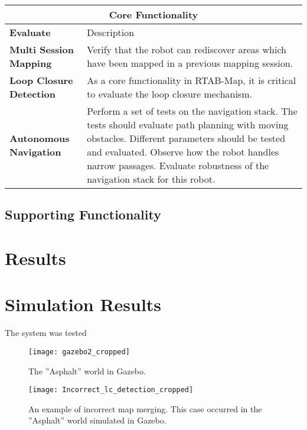 \begin{table}
	\centering
	\begin{tabular}{ p{2.5cm} | p{7cm} }
	\multicolumn{2}{c}{Core Functionality}\\
\hline
	\textbf{Evaluate} & Description\\
	\hline
	\textbf{Multi Session Mapping} & Verify that the robot can rediscover areas which have been mapped in a previous mapping session.\\
	\hline
	\textbf{Loop Closure Detection} & As a core functionality in \ac{RTAB-Map}, it is critical to evaluate the loop closure mechanism.\\
	\hline
	\textbf{Autonomous Navigation} & Perform a set of tests on the navigation stack. The tests should evaluate path planning with moving obstacles. Different parameters should be tested and evaluated. Observe how the robot handles narrow passages. Evaluate robustness of the navigation stack for this robot.\\
	\hline
	\end{tabular}
	\caption{}
\end{table}


\subsection{Supporting Functionality}

\section{Results}

\section{Simulation Results}

The system was tested 

\begin{figure}[p]
	\centering
	\texttt{[image: gazebo2\_cropped]}
	\caption{The ''Asphalt'' world in Gazebo. }
	\label{fig:Incorrect_lc_detection}
\end{figure}

\begin{figure}[p]
	\centering
	\texttt{[image: Incorrect\_lc\_detection\_cropped]}
	\caption{An example of incorrect map merging. This case occurred in the ''Asphalt'' world simulated in Gazebo.}
	\label{fig:Incorrect_lc_detection}
\end{figure}

